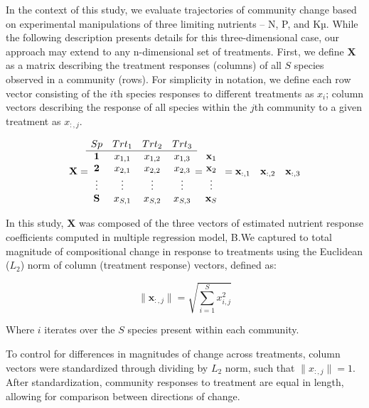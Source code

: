 \documentclass[twoside,12pt,final]{ucthesis-CA2012}
\begin{document}
\begin{ucmainmatter}
In the context of this study, we evaluate trajectories of community change based on experimental manipulations of three limiting nutrients -- N, P, and Kµ. While the following description presents details for this three-dimensional case, our approach may extend to any n-dimensional set of treatments. First, we define \(\mathbf{X}\) as a matrix describing the treatment responses (columns) of all \(S\) species observed in a community (rows). For simplicity in notation, we define each row vector consisting of the \(i\)th species responses to different treatments as \(x_i\); column vectors describing the response of all species within the \(j\)th community to a given treatment as \(x_{:,j}\).

\[
\mathbf{X} = 
\begin{matrix}
Sp & Trt_1 & Trt_2 & Trt_3\\
\hline
\mathbf{1}& x_{1,1} & x_{1,2} & x_{1,3} \\
\mathbf{2} & x_{2,1} & x_{2,2} & x_{2,3} \\
\vdots & \vdots & \vdots & \vdots \\
\mathbf{S} & x_{S,1} & x_{S,2} & x_{S,3} \\
\end{matrix} =
\begin{matrix}
\\
\mathbf{x}_1 \\
\mathbf{x}_2 \\
\vdots \\
\mathbf{x}_S \\
\end{matrix} \\
= \\
\begin{matrix}
\mathbf{x}_{:,1} & \mathbf{x}_{:,2} & \mathbf{x}_{:,3}\\
\end{matrix}
\]

In this study, \(\mathbf{X}\) was composed of the three vectors of estimated nutrient response coefficients computed in multiple regression model, B.We captured to total magnitude of compositional change in response to treatments using the Euclidean (\(L_2\)) norm of column (treatment response) vectors, defined as:

\[\|\mathbf{x}_{:,j}\| = \sqrt{\sum_{i = 1}^{S} x_{i,j}^2}\]

Where \(i\) iterates over the \(S\) species present within each community.

To control for differences in magnitudes of change across treatments, column vectors were standardized through dividing by \(L_2\) norm, such that \(\|x_{:,j}\| = 1\). After standardization, community responses to treatment are equal in length, allowing for comparison between directions of change.


\end{ucmainmatter}
\end{document}
